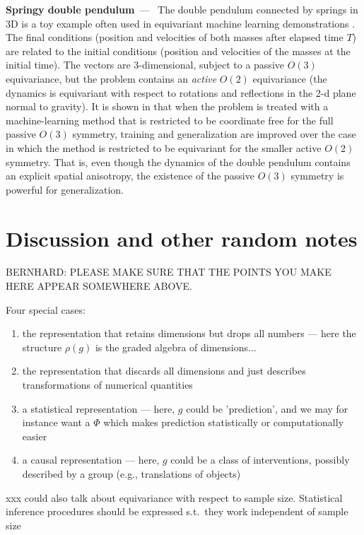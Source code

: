 \documentclass{article}
\renewcommand{\paragraph}[1]{\par\textbf{#1}~---~}
\begin{document}
\paragraph{Springy double pendulum}
The double pendulum connected by springs in 3D is a toy example often used in equivariant machine learning demonstrations \cite{finzi2021practical; yao2021simple}. 
The final conditions (position and velocities of both masses after elapsed time $T$) are related to the initial conditions (position and velocities of the masses at the initial time).
The vectors are 3-dimensional, subject to a passive $O(3)$ equivariance, but the problem contains an \emph{active} $O(2)$ equivariance (the dynamics is equivariant with respect to rotations and reflections in the 2-d plane normal to gravity).
It is shown in \cite{yao2021simple} that when the problem is treated with a machine-learning method that is restricted to be coordinate free for the full passive $O(3)$ symmetry, training and generalization are improved over the case in which the method is restricted to be equivariant for the smaller active $O(2)$ symmetry.
That is, even though the dynamics of the double pendulum contains an explicit spatial anisotropy, the existence of the passive $O(3)$ symmetry is powerful for generalization.

\section{Discussion and other random notes}
BERNHARD: PLEASE MAKE SURE THAT THE POINTS YOU MAKE HERE APPEAR SOMEWHERE ABOVE. 

Four special cases:
\begin{enumerate}
    \item the representation that retains dimensions but drops all numbers --- here the structure $\rho(g)$ is the graded algebra of dimensions...
    \item the representation that discards all dimensions and just describes transformations of numerical quantities
    \item a statistical representation --- here, $g$ could be 'prediction', and we may for instance want a $\Phi$ which makes prediction statistically or computationally easier
    \item a causal representation --- here, $g$ could be a class of interventions, possibly described by a group (e.g., translations of objects)
\end{enumerate}

xxx could also talk about equivariance with respect to sample size. Statistical inference procedures should be expressed s.t.\ they work independent of sample size
\end{document}
